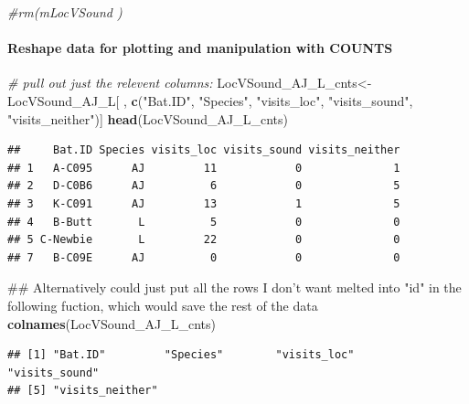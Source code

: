 \documentclass[]{article}
\newenvironment{Shaded}{\begin{snugshade}}{\end{snugshade}}
\newcommand{\KeywordTok}[1]{\textcolor[rgb]{0.13,0.29,0.53}{\textbf{{#1}}}}
\newcommand{\StringTok}[1]{\textcolor[rgb]{0.31,0.60,0.02}{{#1}}}
\newcommand{\CommentTok}[1]{\textcolor[rgb]{0.56,0.35,0.01}{\textit{{#1}}}}
\newcommand{\NormalTok}[1]{{#1}}
\let\oldparagraph\paragraph
\renewcommand{\paragraph}[1]{\oldparagraph{#1}\mbox{}}
\begin{document}
\begin{Shaded}
\begin{Highlighting}[]
\CommentTok{#rm(mLocVSound )}
\end{Highlighting}
\end{Shaded}

\paragraph{Reshape data for plotting and manipulation with
COUNTS}\label{reshape-data-for-plotting-and-manipulation-with-counts}

\begin{Shaded}
\begin{Highlighting}[]
\CommentTok{# pull out just the relevent columns: }
\NormalTok{LocVSound_AJ_L_cnts<-}\StringTok{ }\NormalTok{LocVSound_AJ_L[ , }\KeywordTok{c}\NormalTok{(}\StringTok{"Bat.ID"}\NormalTok{, }\StringTok{"Species"}\NormalTok{, }\StringTok{"visits_loc"}\NormalTok{, }\StringTok{"visits_sound"}\NormalTok{, }\StringTok{"visits_neither"}\NormalTok{)]}
\KeywordTok{head}\NormalTok{(LocVSound_AJ_L_cnts)}
\end{Highlighting}
\end{Shaded}

\begin{verbatim}
##     Bat.ID Species visits_loc visits_sound visits_neither
## 1   A-C095      AJ         11            0              1
## 2   D-C0B6      AJ          6            0              5
## 3   K-C091      AJ         13            1              5
## 4   B-Butt       L          5            0              0
## 5 C-Newbie       L         22            0              0
## 7   B-C09E      AJ          0            0              0
\end{verbatim}

\begin{Shaded}
\begin{Highlighting}[]
\NormalTok{## Alternatively could just put all the rows I don't want melted into "id" in the following fuction, which would save the rest of the data}
\KeywordTok{colnames}\NormalTok{(LocVSound_AJ_L_cnts)}
\end{Highlighting}
\end{Shaded}

\begin{verbatim}
## [1] "Bat.ID"         "Species"        "visits_loc"     "visits_sound"  
## [5] "visits_neither"
\end{verbatim}
\end{document}
